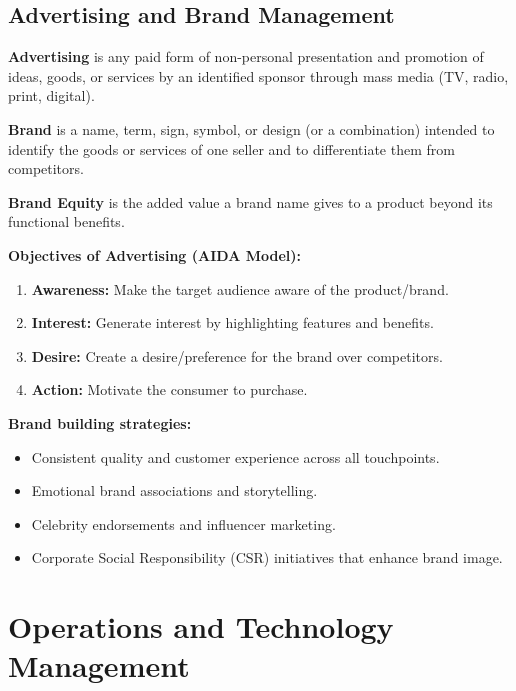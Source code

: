 \documentclass[12pt,a4paper]{article}
\begin{document}
\subsection{Advertising and Brand Management}

\begin{tcolorbox}[defbox, title={\textbf{Advertising and Brand Management}}]
\textbf{Advertising} is any paid form of non-personal presentation and promotion of ideas, goods, or services by an identified sponsor through mass media (TV, radio, print, digital).
\par\vspace{3pt}
\textbf{Brand} is a name, term, sign, symbol, or design (or a combination) intended to identify the goods or services of one seller and to differentiate them from competitors.
\par\vspace{3pt}
\textbf{Brand Equity} is the added value a brand name gives to a product beyond its functional benefits.
\end{tcolorbox}

\textbf{Objectives of Advertising (AIDA Model):}
\begin{enumerate}[label=\textbf{\arabic*.}, leftmargin=*, itemsep=2pt, topsep=2pt]
  \item \textbf{Awareness:} Make the target audience aware of the product/brand.
  \item \textbf{Interest:} Generate interest by highlighting features and benefits.
  \item \textbf{Desire:} Create a desire/preference for the brand over competitors.
  \item \textbf{Action:} Motivate the consumer to purchase.
\end{enumerate}

\textbf{Brand building strategies:}
\begin{itemize}[leftmargin=*, itemsep=2pt]
  \item Consistent quality and customer experience across all touchpoints.
  \item Emotional brand associations and storytelling.
  \item Celebrity endorsements and influencer marketing.
  \item Corporate Social Responsibility (CSR) initiatives that enhance brand image.
\end{itemize}

\section{Operations and Technology Management}
\end{document}
